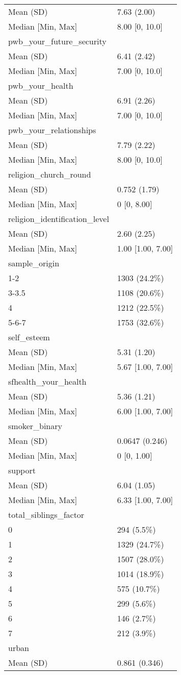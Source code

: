 \documentclass[
  singlecolumn,
  9pt]{article}
\begin{document}
\begin{longtable}[]{@{}ll@{}}
Mean (SD) & 7.63 (2.00) \\
Median {[}Min, Max{]} & 8.00 {[}0, 10.0{]} \\
pwb\_your\_future\_security & \\
Mean (SD) & 6.41 (2.42) \\
Median {[}Min, Max{]} & 7.00 {[}0, 10.0{]} \\
pwb\_your\_health & \\
Mean (SD) & 6.91 (2.26) \\
Median {[}Min, Max{]} & 7.00 {[}0, 10.0{]} \\
pwb\_your\_relationships & \\
Mean (SD) & 7.79 (2.22) \\
Median {[}Min, Max{]} & 8.00 {[}0, 10.0{]} \\
religion\_church\_round & \\
Mean (SD) & 0.752 (1.79) \\
Median {[}Min, Max{]} & 0 {[}0, 8.00{]} \\
religion\_identification\_level & \\
Mean (SD) & 2.60 (2.25) \\
Median {[}Min, Max{]} & 1.00 {[}1.00, 7.00{]} \\
sample\_origin & \\
1-2 & 1303 (24.2\%) \\
3-3.5 & 1108 (20.6\%) \\
4 & 1212 (22.5\%) \\
5-6-7 & 1753 (32.6\%) \\
self\_esteem & \\
Mean (SD) & 5.31 (1.20) \\
Median {[}Min, Max{]} & 5.67 {[}1.00, 7.00{]} \\
sfhealth\_your\_health & \\
Mean (SD) & 5.36 (1.21) \\
Median {[}Min, Max{]} & 6.00 {[}1.00, 7.00{]} \\
smoker\_binary & \\
Mean (SD) & 0.0647 (0.246) \\
Median {[}Min, Max{]} & 0 {[}0, 1.00{]} \\
support & \\
Mean (SD) & 6.04 (1.05) \\
Median {[}Min, Max{]} & 6.33 {[}1.00, 7.00{]} \\
total\_siblings\_factor & \\
0 & 294 (5.5\%) \\
1 & 1329 (24.7\%) \\
2 & 1507 (28.0\%) \\
3 & 1014 (18.9\%) \\
4 & 575 (10.7\%) \\
5 & 299 (5.6\%) \\
6 & 146 (2.7\%) \\
7 & 212 (3.9\%) \\
urban & \\
Mean (SD) & 0.861 (0.346) \\
\end{longtable}
\end{document}
